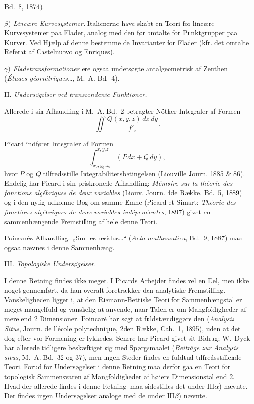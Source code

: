 \documentclass{article}
\begin{document}
Bd.~8, 1874).

$\beta$) \emph{Lineære Kurvesystemer.} Italienerne have skabt en Teori for lineære Kurvesystemer paa Flader, analog med den før omtalte for Punktgrupper paa Kurver. Ved Hjælp af denne bestemme de Invarianter for Flader (kfr. det omtalte Referat af Castelnuovo og Enriques).

$\gamma$) \emph{Fladetransformationer} ere ogsaa undersøgte antalgeometrisk af Zeuthen (\emph{Études géométriques\dots}, M.~A. Bd.~4).

II. \emph{Undersøgelser ved transcendente Funktioner.}

Allerede i sin Afhandling i M.~A. Bd.~2 betragter Nöther Integraler af Formen
\[
\iint \frac{Q(x, y, z)\,dx\,dy}{f'_z}.
\]

Picard indfører Integraler af Formen
\[
\int_{x_0, y_0, z_0}^{x, y, z} (P\,dx + Q\,dy),
\]
hvor $P$ og $Q$ tilfredsstille Integrabilitetsbetingelsen (Liouville Journ. 1885 \& 86). Endelig har Picard i sin priskronede Afhandling: \emph{Mémoire sur la théorie des fonctions algébriques de deux variables} (Liouv. Journ. 4de Række. Bd.~5, 1889) og i den nylig udkomne Bog om samme Emne (Picard et Simart: \emph{Théorie des fonctions algébriques de deux variables indépendantes}, 1897) givet en sammenhængende Fremstilling af hele denne Teori.

Poincarés Afhandling: „Sur les residus\dots“ (\emph{Acta mathematica}, Bd.~9, 1887) maa ogsaa nævnes i denne Sammenhæng.

III. \emph{Topologiske Undersøgelser.}

I denne Retning findes ikke meget. I Picards Arbejder findes vel en Del, men ikke noget gennemført, da han overalt foretrækker den analytiske Fremstilling. Vanskeligheden ligger i, at den Riemann-Bettiske Teori for Sammenhængstal er meget mangelfuld og vanskelig at anvende, naar Talen er om Mangfoldigheder af mere end 2 Dimensioner. Poincaré har søgt at fuldstændiggøre den (\emph{Analysis Situs}, Journ. de l'école polytechnique, 2den Række, Cah.~1, 1895), uden at det dog efter vor Formening er lykkedes. Senere har Picard givet sit Bidrag; W.~Dyck har allerede tidligere beskæftiget sig med Spørgsmaalet (\emph{Beiträge zur Analysis situs}, M.~A. Bd.~32 og 37), men ingen Steder findes en fuldtud tilfredsstillende Teori. Forud for Undersøgelser i denne Retning maa derfor gaa en Teori for topologisk Sammensvaren af Mangfoldigheder af højere Dimensionstal end 2. Hvad der allerede findes i denne Retning, maa sidestilles det under III$\alpha$) nævnte. Der findes ingen Undersøgelser analoge med de under III$\beta$) nævnte.
\end{document}
